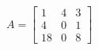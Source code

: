 \documentclass[10pt,convert]{standalone}
\begin{document}
$ A = \begin{bmatrix}
1 & 4 & 3 \\
4 & 0 & 1 \\
18 & 0 & 8
\end{bmatrix}  $
\end{document}
